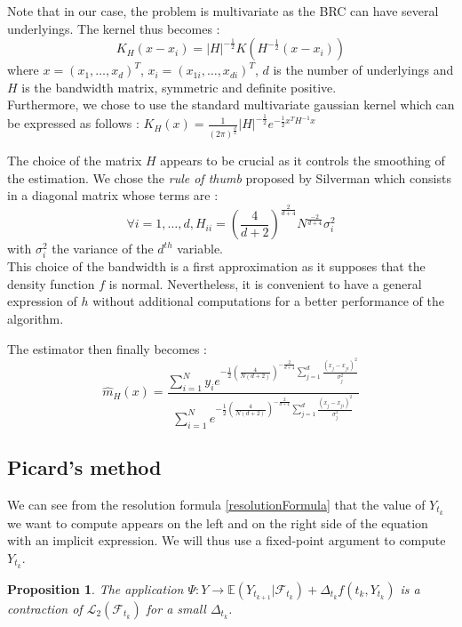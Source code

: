 \documentclass[a4paper,11pt,english]{book}
\newtheorem{prop}{Proposition}
\begin{document}
Note that in our case, the problem is multivariate as the BRC can have several underlyings. The kernel thus becomes : $$K_{H}(x-x_{i}) = |H|^{-\frac{1}{2}}K(H^{-\frac{1}{2}}(x-x_{i}))$$
where $x=(x_{1},\ldots,x_{d})^{T}$, $x_{i}=(x_{1i},\ldots,x_{di})^{T}$, $d$ is the number of underlyings and $H$ is the bandwidth matrix, symmetric and definite positive.\\

Furthermore, we chose to use the standard multivariate gaussian kernel which can be expressed as follows :
$K_{H}(x)=\frac{1}{(2\pi)^{\frac{d}{2}}}|H|^{-\frac{1}{2}}e^{-\frac{1}{2}x^{T}H^{-1}x}$

The choice of the matrix $H$ appears to be crucial as it controls the smoothing of the estimation. We chose the \textit{rule of thumb} proposed by Silverman \cite{silverman1986density} which consists in a diagonal matrix whose terms are : $$\forall i=1,\ldots,d, H_{ii} = (\frac{4}{d+2})^{\frac{2}{d+4}}N^{\frac{-2}{d+4}}\sigma_{i}^{2}$$
with $\sigma_{i}^{2}$ the variance of the $d^{th}$ variable.\\

This choice of the bandwidth is a first approximation as it supposes that the density function $f$ is normal. Nevertheless, it is convenient to have a general expression of $h$ without additional computations for a better performance of the algorithm. 

The estimator then finally becomes :
$$\hat{m}_{H}(x)= \frac{\sum_{i=1}^{N}y_{i}e^{-\frac{1}{2}(\frac{4}{N(d+2)})^{-\frac{2}{d+4}}\sum_{j=1}^{d}\frac{(x_{j}-x_{ji})^{2}}{\sigma_{j}^{2}}}}{\sum_{i=1}^{N}e^{-\frac{1}{2}(\frac{4}{N(d+2)})^{-\frac{2}{d+4}}\sum_{j=1}^{d}\frac{(x_{j}-x_{ji})^{2}}{\sigma_{j}^{2}}}}$$
\subsection{Picard's method}
We can see from the resolution formula \eqref{resolutionFormula} that the value of $Y_{t_{k}}$ we want to compute appears on the left and on the right side of the equation with an implicit expression. We will thus use a fixed-point argument to compute $Y_{t_{k}}$.

\begin{prop}
The application $\Psi : Y \rightarrow \mathbb{E}(Y_{t_{k+1}}|\mathcal{F}_{t_{k}}) + \Delta_{t_k}f(t_{k},Y_{t_{k}})$ is a contraction of $\mathcal{L}_{2}(\mathcal{F}_{t_{k}})$ for a small $\Delta_{t_{k}}$.
\end{prop}
\end{document}
